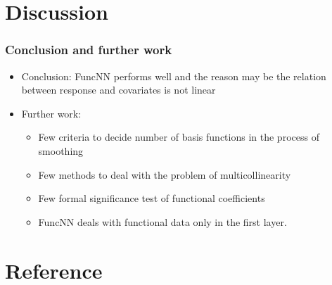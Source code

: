\documentclass[
	9pt, %
]{beamer}
\begin{document}
\section{Discussion}
\begin{frame}
	\frametitle{Conclusion and further work}
	\begin{itemize}
	\item Conclusion: FuncNN performs well and the reason may be the relation between response and covariates is not linear 
	\bigskip
	\item Further work:
	\smallskip
		\begin{itemize}
		\item Few criteria to decide number of basis functions in the process of smoothing
		\smallskip
		\item Few methods to deal with the problem of multicollinearity
		\smallskip
		\item Few formal significance test of functional coefficients
		\smallskip
		\item FuncNN deals with functional data only in the first layer.
		\end{itemize}
	\end{itemize}
\end{frame}






\section{Reference}

%	
%	
%	

\end{document}
